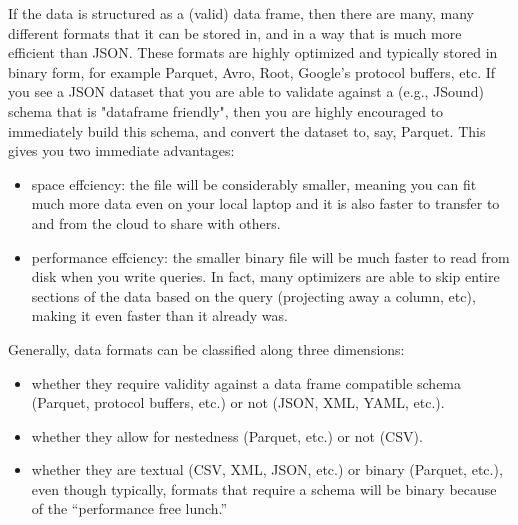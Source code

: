 If the data is structured as a (valid) data frame, then there are many, many different formats that it can be stored in, and in a way that is much more efficient than JSON. These formats are highly optimized and typically stored in binary form, for example Parquet, Avro, Root, Google's protocol buffers, etc. If you see a JSON dataset that you are able to validate against a (e.g., JSound) schema that is "dataframe friendly", then you are highly encouraged to immediately build this schema, and convert the dataset to, say, Parquet. This gives you two immediate advantages:
\begin{itemize}
    \item space effciency: the file will be considerably smaller, meaning you can fit much more data even on your local laptop and it is also faster to transfer to and from the cloud to share with others.
    \item performance effciency: the smaller binary file will be much faster to read from disk when you write queries. In fact, many optimizers are able to skip entire sections of the data based on the query (projecting away a column, etc), making it even faster than it already was.
\end{itemize}
Generally, data formats can be classified along three dimensions:
\begin{itemize}
    \item whether they require validity against a data frame compatible schema (Parquet, protocol buffers, etc.) or not (JSON, XML, YAML, etc.).
    \item whether they allow for nestedness (Parquet, etc.) or not (CSV).
    \item whether they are textual (CSV, XML, JSON, etc.) or binary (Parquet, etc.), even though typically, formats that require a schema will be binary because of the “performance free lunch.”
\end{itemize}
